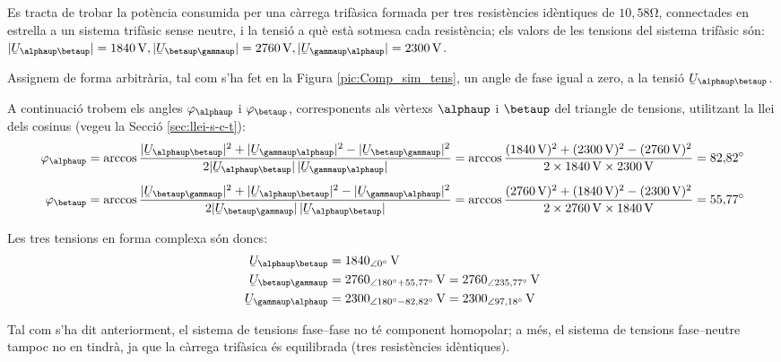 \begin{exemple}
Es tracta de trobar la pot\`{e}ncia consumida per una c\`{a}rrega trif\`{a}sica
formada per tres resist\`{e}ncies id\`{e}ntiques de $10{,}58\unit{\ohm}$,
connectades en estrella a un sistema trif\`{a}sic sense neutre, i la
tensi\'{o} a qu\`{e} est\`{a} sotmesa cada resist\`{e}ncia; els valors de les
tensions del sistema trif\`{a}sic s\'{o}n: $|\cmplx{U}_{\alphaup\betaup}| =
1840\unit{V}, |\cmplx{U}_{\betaup\gammaup}| = 2760\unit{V},
|\cmplx{U}_{\gammaup\alphaup}| = 2300\unit{V}$.

Assignem de forma arbitr\`{a}ria, tal com s'ha fet en la Figura
\vref{pic:Comp_sim_tens}, un angle de fase igual a zero, a la tensi\'{o}
$\cmplx{U}_{\alphaup\betaup}$.

A continuaci\'{o} trobem els angles $\varphi_\alphaup$ i $\varphi_\betaup$,
corresponents als v\`{e}rtexs  $\alphaup$ i $\betaup$ del triangle de
tensions, utilitzant la llei dels cosinus (vegeu la Secci\'{o}
\vref{sec:llei-s-c-t}): 
\begin{align*}
    \varphi_\alphaup &= \arccos \frac{|\cmplx{U}_{\alphaup\betaup}|^2 + |\cmplx{U}_{\gammaup\alphaup}|^2 -
    |\cmplx{U}_{\betaup\gammaup}|^2}{2 |\cmplx{U}_{\alphaup\betaup}| \,|\cmplx{U}_{\gammaup\alphaup}|} =
    \arccos \frac{(1840\unit{V})^2 + (2300\unit{V})^2 - (2760\unit{V})^2}{2 \times 1840\unit{V}
    \times 2300\unit{V}} = 82{,}82\degree \\[1ex]
    \varphi_\betaup &= \arccos \frac{|\cmplx{U}_{\betaup\gammaup}|^2 + |\cmplx{U}_{\alphaup\betaup}|^2 -
    |\cmplx{U}_{\gammaup\alphaup}|^2}{2 |\cmplx{U}_{\betaup\gammaup}| \,|\cmplx{U}_{\alphaup\betaup}|} =
    \arccos \frac{(2760\unit{V})^2 + (1840\unit{V})^2 - (2300\unit{V})^2}{2 \times 2760\unit{V}
    \times 1840\unit{V}} = 55{,}77\degree
\end{align*}

Les tres tensions en forma complexa s\'{o}n doncs:
\begin{align*}
\cmplx{U}_{\alphaup\betaup} &= 1840_{\angle 0\degree}\unit{V} \\
\cmplx{U}_{\betaup\gammaup} &= 2760_{\angle 180\degree +
55{,}77\degree}\unit{V} =
2760_{\angle 235{,}77\degree}\unit{V} \\
\cmplx{U}_{\gammaup\alphaup} &= 2300_{\angle 180\degree -
82{,}82\degree}\unit{V} = 2300_{\angle 97{,}18\degree}
\unit{V}
\end{align*}

Tal com s'ha dit anteriorment, el sistema de tensions fase--fase no
t\'{e} component homopolar; a m\'{e}s, el sistema de tensions fase--neutre
tampoc no en tindr\`{a}, ja que la c\`{a}rrega trif\`{a}sica \'{e}s equilibrada
(tres resist\`{e}ncies id\`{e}ntiques).


\end{exemple}
